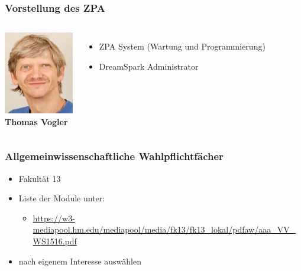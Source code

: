 \documentclass{beamer}
\begin{document}
    \begin{frame}
    	\frametitle{Vorstellung des ZPA}
    	\begin{columns}[t]
    		\includegraphics[width=1.0\textwidth]{vogler.jpg}
    		\\
    		\textbf{Thomas Vogler}
    		\begin{itemize}
    			\item ZPA System (Wartung und Programmierung)
    			\item DreamSpark Administrator
    	    \end{itemize}
    	\end{columns}
    \end{frame}
    
    \begin{frame}
    	\frametitle{Allgemeinwissenschaftliche Wahlpflichtfächer}
    	\begin{itemize}
    		\item Fakultät 13
    		\item Liste der Module unter: 
    		\begin{itemize}
    			\item \url{https://w3-mediapool.hm.edu/mediapool/media/fk13/fk13_lokal/pdfaw/aaa_VV_WS1516.pdf}
    		\end{itemize}
    		\item nach eigenem Interesse auswählen
    	\end{itemize}
    \end{frame}
    
\end{document}
